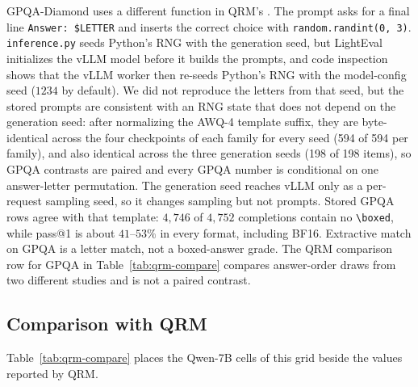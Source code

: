 \documentclass[11pt,a4paper]{article}
\begin{document}
GPQA-Diamond uses a different function in QRM's . The prompt asks for a final line \texttt{Answer: \$LETTER} and inserts the correct choice with \texttt{random.randint(0, 3)}. \texttt{inference.py} seeds Python's RNG with the generation seed, but LightEval initializes the vLLM model before it builds the prompts, and code inspection shows that the vLLM worker then re-seeds Python's RNG with the model-config seed ($1234$ by default). We did not reproduce the letters from that seed, but the stored prompts are consistent with an RNG state that does not depend on the generation seed: after normalizing the AWQ-4 template suffix, they are byte-identical across the four checkpoints of each family for every seed (594 of 594 per family), and also identical across the three generation seeds (198 of 198 items), so GPQA contrasts are paired and every GPQA number is conditional on one answer-letter permutation. The generation seed reaches vLLM only as a per-request sampling seed, so it changes sampling but not prompts. Stored GPQA rows agree with that template: $4{,}746$ of $4{,}752$ completions contain no \texttt{\textbackslash boxed}, while pass@1 is about $41$--$53\%$ in every format, including BF16. Extractive match on GPQA is a letter match, not a boxed-answer grade. The QRM comparison row for GPQA in Table~\ref{tab:qrm-compare} compares answer-order draws from two different studies and is not a paired contrast.

\subsection{Comparison with QRM}
Table~\ref{tab:qrm-compare} places the Qwen-7B cells of this grid beside the values reported by QRM.
\end{document}
